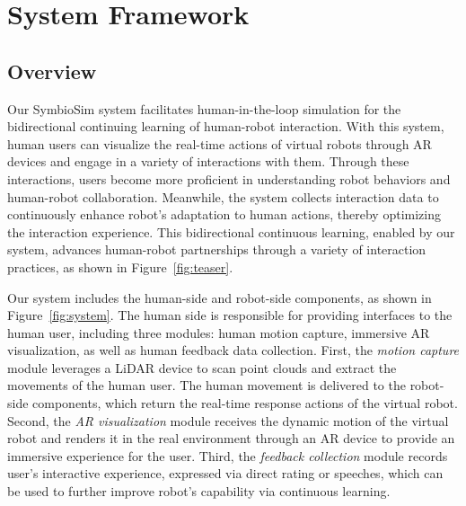 \section{System Framework}
\label{sec:Overview}

\subsection{Overview}
Our SymbioSim system facilitates human-in-the-loop simulation for the bidirectional continuing learning of human-robot interaction. With this system, human users can visualize the real-time actions of virtual robots through AR devices and engage in a variety of interactions with them. %
Through these interactions, users become more proficient in understanding robot behaviors and human-robot collaboration. Meanwhile, the system collects interaction data to continuously enhance robot's adaptation to human actions, thereby optimizing the interaction experience. This bidirectional continuous learning, enabled by our system, advances human-robot partnerships through a variety of interaction practices, as shown in Figure~\ref{fig:teaser}.

Our system includes the human-side and robot-side components, as shown in Figure~\ref{fig:system}. The human side is responsible for providing interfaces to the human user, including three modules: human motion capture, immersive AR visualization, as well as human feedback data collection. First, the \emph{motion capture} module leverages a LiDAR device to scan point clouds and extract the movements of the human user. The human movement is delivered to the robot-side components, which return the real-time response actions of the virtual robot. Second, the \emph{AR visualization} module receives the dynamic motion of the virtual robot and renders it in the real environment through an AR device to provide an immersive experience for the user. Third, the \emph{feedback collection} module records user's interactive experience, expressed via direct rating or speeches, which can be used to further improve robot's capability via continuous learning.

